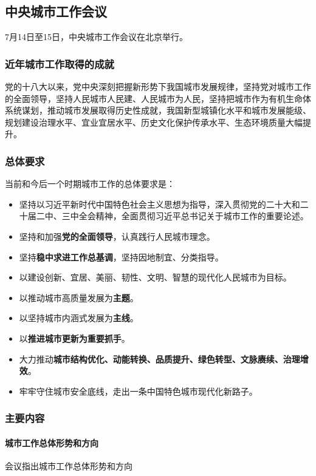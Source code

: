 \subsection{中央城市工作会议}

7月14日至15日，中央城市工作会议在北京举行。

\subsubsection{近年城市工作取得的成就}

党的十八大以来，党中央深刻把握新形势下我国城市发展规律，坚持党对城市工作的全面领导，坚持人民城市人民建、人民城市为人民，坚持把城市作为有机生命体系统谋划，推动城市发展取得历史性成就，我国新型城镇化水平和城市发展能级、规划建设治理水平、宜业宜居水平、历史文化保护传承水平、生态环境质量大幅提升。

\subsubsection{总体要求}

当前和今后一个时期城市工作的总体要求是：

\begin{itemize}
    \item 坚持以习近平新时代中国特色社会主义思想为指导，深入贯彻党的二十大和二十届二中、三中全会精神，全面贯彻习近平总书记关于城市工作的重要论述。
    \item 坚持和加强\textbf{党的全面领导}，认真践行人民城市理念。
    \item 坚持\textbf{稳中求进工作总基调}，坚持因地制宜、分类指导。
    \item 以建设创新、宜居、美丽、韧性、文明、智慧的现代化人民城市为目标。
    \item 以推动城市高质量发展为\textbf{主题}。
    \item 以坚持城市内涵式发展为\textbf{主线}。
    \item 以\textbf{推进城市更新为重要抓手}。
    \item 大力推动\textbf{城市结构优化、动能转换、品质提升、绿色转型、文脉赓续、治理增效}。
    \item 牢牢守住城市安全底线，走出一条中国特色城市现代化新路子。
\end{itemize}

\subsubsection{主要内容}

\paragraph{城市工作总体形势和方向} 会议指出城市工作总体形势和方向

